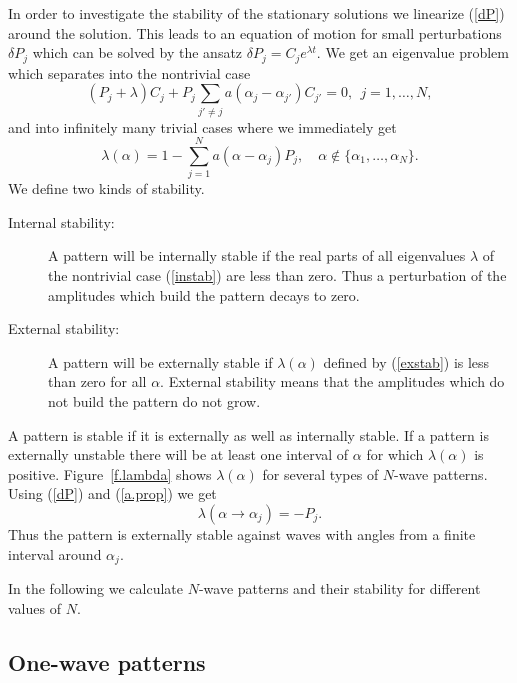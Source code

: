 In order to investigate the stability of the stationary solutions we
linearize (\ref{dP}) around the solution. This leads to an equation
of motion for small perturbations $\delta P_j$ which can be solved by
the ansatz $\delta P_j=C_je^{\lambda t}$. We get an eigenvalue
problem which separates into the nontrivial case
\begin{equation}
  (P_j+\lambda)C_j+P_j\sum\limits_{j'\not=j}
   a(\alpha_j-\alpha_{j'})C_{j'}=0,\ \ j=1,\ldots,N,
  \label{instab}
\end{equation}
and into infinitely many trivial cases where we immediately get
\begin{equation}
  \lambda(\alpha)=1-\sum\limits_{j=1}^Na(\alpha-\alpha_{j})P_{j},
   \quad\alpha\not\in\{\alpha_1,\ldots,\alpha_N\}.
  \label{exstab}
\end{equation}
We define two kinds of stability.
\begin{description}
\item[Internal stability:] 
A pattern will be internally stable if the real parts of all
eigenvalues $\lambda$ of the nontrivial case (\ref{instab}) are less
than zero.  Thus a perturbation of the amplitudes which build the
pattern decays to zero.
\item[External stability:]
A pattern will be externally stable if $\lambda(\alpha)$ defined by
(\ref{exstab}) is less than zero for all $\alpha$. External stability
means that the amplitudes which do not build the pattern do not grow.
\end{description}
A pattern is stable if it is externally as well as internally stable.
If a pattern is externally unstable there will be at least one 
interval of $\alpha$ for which $\lambda(\alpha)$ is positive. 
Figure~\ref{f.lambda} shows $\lambda(\alpha)$ for several types of
$N$-wave patterns. Using (\ref{dP}) and (\ref{a.prop}) we get 
\begin{equation}
  \lambda(\alpha\to\alpha_j)=-P_j.
  \label{exstab0}
\end{equation}
Thus the pattern is externally stable against waves with angles from
a finite interval around $\alpha_j$.

In the following we calculate $N$-wave patterns and their stability
for different values of $N$.

\subsection{\protect\label{wave1}One-wave patterns}

